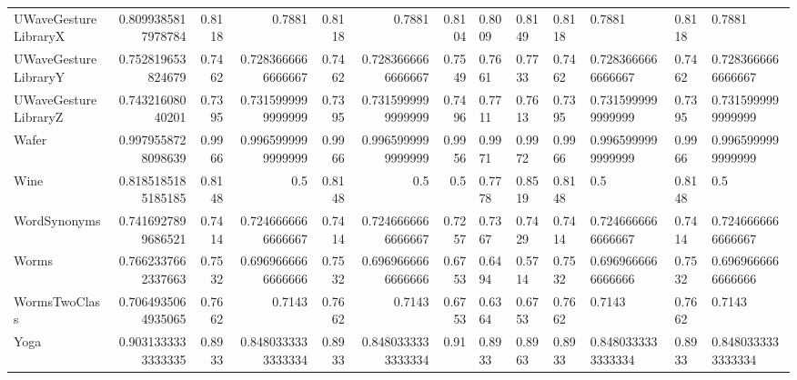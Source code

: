 \begin{table}[t]
\begin{tabular}{lrrrrrr}
UWaveGestureLibraryX & 0.8099385817978784 & 0.8118 & 0.7881 & 0.8118 & 0.7881 & 0.8104 & 0.8009 & 0.8149 & 0.8118 & 0.7881 & 0.8118 & 0.7881 \\
UWaveGestureLibraryY & 0.752819653824679 & 0.7462 & 0.7283666666666667 & 0.7462 & 0.7283666666666667 & 0.7549 & 0.7661 & 0.7733 & 0.7462 & 0.7283666666666667 & 0.7462 & 0.7283666666666667 \\
UWaveGestureLibraryZ & 0.74321608040201 & 0.7395 & 0.7315999999999999 & 0.7395 & 0.7315999999999999 & 0.7496 & 0.7711 & 0.7613 & 0.7395 & 0.7315999999999999 & 0.7395 & 0.7315999999999999 \\
Wafer & 0.9979558728098639 & 0.9966 & 0.9965999999999999 & 0.9966 & 0.9965999999999999 & 0.9956 & 0.9971 & 0.9972 & 0.9966 & 0.9965999999999999 & 0.9966 & 0.9965999999999999 \\
Wine & 0.8185185185185185 & 0.8148 & 0.5 & 0.8148 & 0.5 & 0.5 & 0.7778 & 0.8519 & 0.8148 & 0.5 & 0.8148 & 0.5 \\
WordSynonyms & 0.7416927899686521 & 0.7414 & 0.7246666666666667 & 0.7414 & 0.7246666666666667 & 0.7257 & 0.7367 & 0.7429 & 0.7414 & 0.7246666666666667 & 0.7414 & 0.7246666666666667 \\
Worms & 0.7662337662337663 & 0.7532 & 0.6969666666666666 & 0.7532 & 0.6969666666666666 & 0.6753 & 0.6494 & 0.5714 & 0.7532 & 0.6969666666666666 & 0.7532 & 0.6969666666666666 \\
WormsTwoClass & 0.7064935064935065 & 0.7662 & 0.7143 & 0.7662 & 0.7143 & 0.6753 & 0.6364 & 0.6753 & 0.7662 & 0.7143 & 0.7662 & 0.7143 \\
Yoga & 0.9031333333333335 & 0.8933 & 0.8480333333333334 & 0.8933 & 0.8480333333333334 & 0.91 & 0.8933 & 0.8963 & 0.8933 & 0.8480333333333334 & 0.8933 & 0.8480333333333334 \\
\bottomrule
\end{tabular}
\end{table}

